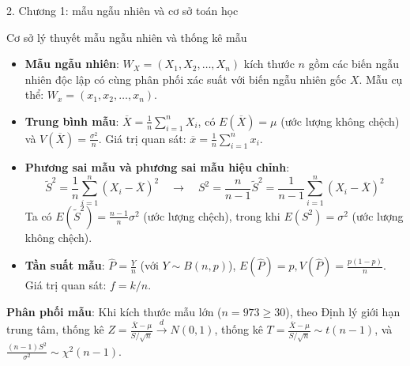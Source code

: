 \documentclass[aspectratio=169, 10pt]{beamer}
\begin{document}
\begin{frame}{2. Chương 1: mẫu ngẫu nhiên và cơ sở toán học}
    \begin{block}{Cơ sở lý thuyết mẫu ngẫu nhiên và thống kê mẫu}
        \footnotesize
        \begin{itemize}\setlength\itemsep{1pt}
            \item \textbf{Mẫu ngẫu nhiên}: $W_X = (X_1, X_2, \dots, X_n)$ kích thước $n$ gồm các biến ngẫu nhiên độc lập có cùng phân phối xác suất với biến ngẫu nhiên gốc $X$. Mẫu cụ thể: $W_x = (x_1, x_2, \dots, x_n)$.
            \item \textbf{Trung bình mẫu}: $\overline{X} = \frac{1}{n}\sum_{i=1}^n X_i$, có $E(\overline{X}) = \mu$ (ước lượng không chệch) và $V(\overline{X}) = \frac{\sigma^2}{n}$. Giá trị quan sát: $\overline{x} = \frac{1}{n}\sum_{i=1}^n x_i$.
            \item \textbf{Phương sai mẫu và phương sai mẫu hiệu chỉnh}:
            \[ \widetilde{S}^2 = \frac{1}{n}\sum_{i=1}^n (X_i - \overline{X})^2 \quad \longrightarrow \quad S^2 = \frac{n}{n-1}\widetilde{S}^2 = \frac{1}{n-1}\sum_{i=1}^n (X_i - \overline{X})^2 \]
            Ta có $E(\widetilde{S}^2) = \frac{n-1}{n}\sigma^2$ (ước lượng chệch), trong khi $E(S^2) = \sigma^2$ (ước lượng không chệch).
            \item \textbf{Tần suất mẫu}: $\widehat{P} = \frac{Y}{n}$ (với $Y \sim B(n, p)$), $E(\widehat{P}) = p, V(\widehat{P}) = \frac{p(1-p)}{n}$. Giá trị quan sát: $f = k/n$.
        \end{itemize}
    \end{block}
    \vspace{2pt}
    \footnotesize\textbf{Phân phối mẫu}: Khi kích thước mẫu lớn ($n = 973 \ge 30$), theo Định lý giới hạn trung tâm, thống kê $Z = \frac{\overline{X} - \mu}{S/\sqrt{n}} \xrightarrow{d} N(0, 1)$, thống kê $T = \frac{\overline{X} - \mu}{S/\sqrt{n}} \sim t(n-1)$, và $\frac{(n-1)S^2}{\sigma^2} \sim \chi^2(n-1)$.
\end{frame}
\end{document}
